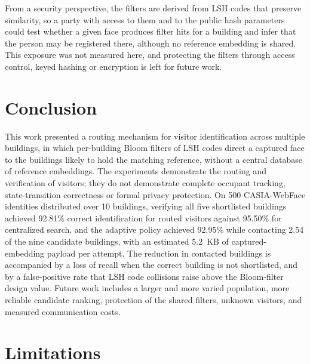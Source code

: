 \documentclass[pdflatex,sn-mathphys-num]{sn-jnl}%
\theoremstyle{thmstyleone}%
\theoremstyle{thmstyletwo}%
\theoremstyle{thmstylethree}%
\begin{document}
From a security perspective, the filters are derived from LSH codes that preserve similarity, so a party with access to them and to the public hash parameters could test whether a given face produces filter hits for a building and infer that the person may be registered there, although no reference embedding is shared. This exposure was not measured here, and protecting the filters through access control, keyed hashing or encryption is left for future work.


\section{Conclusion}
\label{sec:conclusion}

This work presented a routing mechanism for visitor identification across multiple buildings, in which per-building Bloom filters of LSH codes direct a captured face to the buildings likely to hold the matching reference, without a central database of reference embeddings. The experiments demonstrate the routing and verification of visitors; they do not demonstrate complete occupant tracking, state-transition correctness or formal privacy protection. On 500 CASIA-WebFace identities distributed over 10 buildings, verifying all five shortlisted buildings achieved 92.81\% correct identification for routed visitors against 95.50\% for centralized search, and the adaptive policy achieved 92.95\% while contacting 2.54 of the nine candidate buildings, with an estimated 5.2~KB of captured-embedding payload per attempt. The reduction in contacted buildings is accompanied by a loss of recall when the correct building is not shortlisted, and by a false-positive rate that LSH code collisions raise above the Bloom-filter design value. Future work includes a larger and more varied population, more reliable candidate ranking, protection of the shared filters, unknown visitors, and measured communication costs.


\section{Limitations}
\label{sec:limitations}
\end{document}

